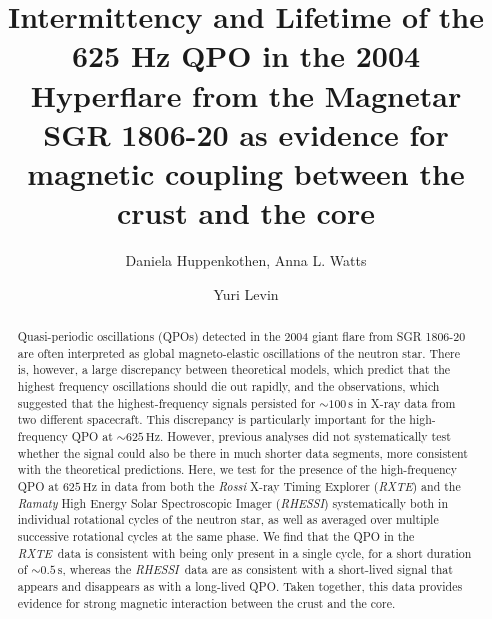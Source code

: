 \documentclass{emulateapj}
\begin{document}
\newcommand{\project}[1]{\textsl{#1}}
\newcommand{\fermi}{\project{Fermi}}
\newcommand{\rxte}{\project{RXTE}}
\newcommand{\rhessi}{\project{RHESSI}}
\newcommand{\hz}{\,\mathrm{Hz}}

\title{Intermittency and Lifetime of the 625 Hz QPO in the 2004 Hyperflare from the Magnetar SGR 1806-20 as evidence for magnetic coupling between the crust and the core}
\author{Daniela Huppenkothen, Anna L. Watts}
\author{Yuri Levin}

\begin{abstract}
Quasi-periodic oscillations (QPOs) detected in the 2004 giant flare from SGR 1806-20 are often interpreted as global magneto-elastic oscillations of the neutron star. There is, however, a large discrepancy between theoretical models, which predict that the highest frequency oscillations should die out rapidly, and the observations, which suggested that the highest-frequency signals persisted for $\sim\!\! 100\,\mathrm{s}$ in X-ray data from two different spacecraft. This discrepancy is particularly important for the high-frequency QPO at $\sim\! 625 \hz$. However, previous analyses did not systematically test whether the signal could also be there in much shorter data segments, more consistent with the theoretical predictions. Here, we test for the presence of the high-frequency QPO at $625 \hz$ in data from both the \project{Rossi} X-ray Timing Explorer (\rxte) and the \project{Ramaty} High Energy Solar Spectroscopic Imager (\rhessi) systematically both in individual rotational cycles of the neutron star, as well as averaged over multiple successive rotational cycles at the same phase. We find that the QPO in the \rxte\ data is consistent with being only present in a single cycle, for a short duration of $\sim 0.5 \,\mathrm{s}$, whereas the \rhessi\ data are as consistent with a short-lived signal that appears and disappears as with a long-lived QPO. Taken together, this data provides evidence for strong magnetic interaction between the crust and the core.


\end{abstract} 

\end{document}
